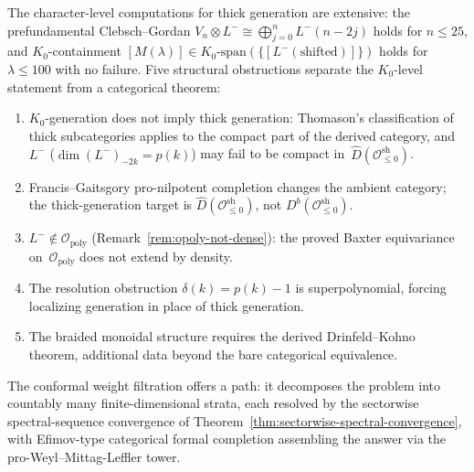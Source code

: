 \begin{remark}
\label{rem:mc3-sharpened-diagnosis}
The character-level computations for thick generation are extensive: the
prefundamental Clebsch--Gordan $V_n \otimes L^- \cong
\bigoplus_{j=0}^{n} L^-(n{-}2j)$ holds for $n \le 25$, and
$K_0$-containment $[M(\lambda)] \in
K_0\text{-span}(\{[L^-(\mathrm{shifted})]\})$ holds for
$\lambda \le 100$ with no failure. Five structural obstructions
separate the $K_0$-level statement from a categorical theorem:
\begin{enumerate}[label=\textup{(\roman*)}]
\item $K_0$-generation does not imply thick generation: Thomason's
 classification of thick subcategories applies to the compact part
 of the derived category, and $L^-$ ($\dim(L^-)_{-2k} = p(k)$)
 may fail to be compact in~$\widehat{D}(\mathcal{O}^{\mathrm{sh}}_{\le 0})$.
\item Francis--Gaitsgory pro-nilpotent completion changes the ambient
 category; the thick-generation target is
 $\widehat{D}(\mathcal{O}^{\mathrm{sh}}_{\le 0})$, not
 $D^b(\mathcal{O}^{\mathrm{sh}}_{\le 0})$.
\item $L^- \notin \mathcal{O}_{\mathrm{poly}}$
 (Remark~\ref{rem:opoly-not-dense}): the proved Baxter equivariance
 on~$\mathcal{O}_{\mathrm{poly}}$ does not extend by density.
\item The resolution obstruction $\delta(k) = p(k) - 1$ is
 superpolynomial, forcing localizing generation in place of thick
 generation.
\item The braided monoidal structure requires the derived
 Drinfeld--Kohno theorem, additional data beyond the bare categorical
 equivalence.
\end{enumerate}
The conformal weight filtration offers a path: it decomposes the problem
into countably many finite-dimensional strata, each resolved by the
sectorwise spectral-sequence convergence of
Theorem~\ref{thm:sectorwise-spectral-convergence}, with Efimov-type
categorical formal completion assembling the answer via the
pro-Weyl--Mittag-Leffler tower.
\end{remark}

